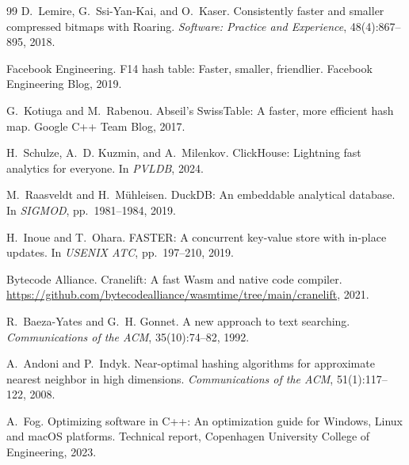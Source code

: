 \documentclass[10pt]{article}
\theoremstyle{definition}
\begin{document}
\begin{thebibliography}{99}
D.~Lemire, G.~Ssi-Yan-Kai, and O.~Kaser.
\newblock Consistently faster and smaller compressed bitmaps with Roaring.
\newblock \emph{Software: Practice and Experience}, 48(4):867--895, 2018.

Facebook Engineering.
\newblock F14 hash table: Faster, smaller, friendlier.
\newblock Facebook Engineering Blog, 2019.

G.~Kotiuga and M.~Rabenou.
\newblock Abseil's SwissTable: A faster, more efficient hash map.
\newblock Google C++ Team Blog, 2017.

H.~Schulze, A.~D. Kuzmin, and A.~Milenkov.
\newblock ClickHouse: Lightning fast analytics for everyone.
\newblock In \emph{PVLDB}, 2024.

M.~Raasveldt and H.~M{\"u}hleisen.
\newblock DuckDB: An embeddable analytical database.
\newblock In \emph{SIGMOD}, pp.~1981--1984, 2019.

H.~Inoue and T.~Ohara.
\newblock FASTER: A concurrent key-value store with in-place updates.
\newblock In \emph{USENIX ATC}, pp.~197--210, 2019.

Bytecode Alliance.
\newblock Cranelift: A fast Wasm and native code compiler.
\newblock \url{https://github.com/bytecodealliance/wasmtime/tree/main/cranelift}, 2021.

R.~Baeza-Yates and G.~H. Gonnet.
\newblock A new approach to text searching.
\newblock \emph{Communications of the ACM}, 35(10):74--82, 1992.

A.~Andoni and P.~Indyk.
\newblock Near-optimal hashing algorithms for approximate nearest neighbor in high dimensions.
\newblock \emph{Communications of the ACM}, 51(1):117--122, 2008.

A.~Fog.
\newblock Optimizing software in C++: An optimization guide for Windows, Linux and macOS platforms.
\newblock Technical report, Copenhagen University College of Engineering, 2023.

\end{thebibliography}
\end{document}
